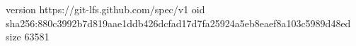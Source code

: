 version https://git-lfs.github.com/spec/v1
oid sha256:880c3992b7d819aae1ddb426dcfad17d7fa25924a5eb8eaef8a103c5989d48ed
size 63581
